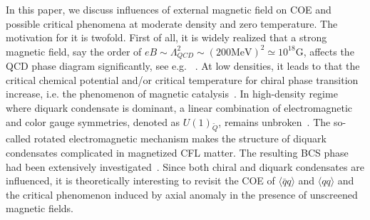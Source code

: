 \documentclass[prd, showpacs,nofootinbib,amsmath,amssymb,12pt]{revtex4}
\begin{document}
In this paper, we discuss influences of external magnetic field on COE and possible critical phenomena at moderate density and zero temperature.
The motivation for it is twofold.
First of all, it is widely realized that a strong magnetic field, say the order of $eB \sim \Lambda_{QCD}^2 \sim (200\text{MeV})^2 \simeq10^{18}\text{G}$, 
affects the QCD phase diagram significantly, see e.g. ~\cite{andersen2016phase}.
At low densities, it leads to that the critical chemical potential and/or critical temperature for chiral phase transition increase, i.e. the phenomenon of magnetic catalysis~\cite{Gusynin1994Dimensional,Miransky2012Catalysis}.
In high-density regime where diquark condensate is dominant, a linear combination of electromagnetic and color gauge symmetries, denoted as $U(1)_{\widetilde{Q}}$, remains unbroken~\cite{alford1998qcd,alford2000mg}. The so-called rotated electromagnetic mechanism makes the structure of diquark condensates complicated in magnetized CFL matter. The resulting BCS phase had been extensively investigated~\cite{ferrer2005magnetic,fukushima2008color,ferrer2006color,ferrer2007magnetic}.
Since both chiral and diquark condensates are influenced, it is theoretically interesting to revisit 
the COE of $\langle\bar{q}q\rangle$ and $\langle qq\rangle$ and the critical phenomenon induced by axial anomaly in the presence of   
unscreened magnetic fields. 
\end{document}

